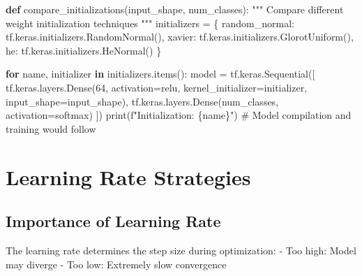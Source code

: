 \documentclass[
  letterpaper,
  DIV=11,
  numbers=noendperiod]{scrreprt}
\newenvironment{Shaded}{\begin{snugshade}}{\end{snugshade}}
\newcommand{\BuiltInTok}[1]{\textcolor[rgb]{0.00,0.23,0.31}{#1}}
\newcommand{\CommentTok}[1]{\textcolor[rgb]{0.37,0.37,0.37}{#1}}
\newcommand{\ControlFlowTok}[1]{\textcolor[rgb]{0.00,0.23,0.31}{\textbf{#1}}}
\newcommand{\DecValTok}[1]{\textcolor[rgb]{0.68,0.00,0.00}{#1}}
\newcommand{\KeywordTok}[1]{\textcolor[rgb]{0.00,0.23,0.31}{\textbf{#1}}}
\newcommand{\NormalTok}[1]{\textcolor[rgb]{0.00,0.23,0.31}{#1}}
\newcommand{\OperatorTok}[1]{\textcolor[rgb]{0.37,0.37,0.37}{#1}}
\newcommand{\SpecialCharTok}[1]{\textcolor[rgb]{0.37,0.37,0.37}{#1}}
\newcommand{\SpecialStringTok}[1]{\textcolor[rgb]{0.13,0.47,0.30}{#1}}
\newcommand{\StringTok}[1]{\textcolor[rgb]{0.13,0.47,0.30}{#1}}
\begin{document}
\begin{Shaded}
\begin{Highlighting}[]
\KeywordTok{def}\NormalTok{ compare\_initializations(input\_shape, num\_classes):}
    \CommentTok{"""}
\CommentTok{    Compare different weight initialization techniques}
\CommentTok{    """}
\NormalTok{    initializers }\OperatorTok{=}\NormalTok{ \{}
        \StringTok{\textquotesingle{}random\_normal\textquotesingle{}}\NormalTok{: tf.keras.initializers.RandomNormal(),}
        \StringTok{\textquotesingle{}xavier\textquotesingle{}}\NormalTok{: tf.keras.initializers.GlorotUniform(),}
        \StringTok{\textquotesingle{}he\textquotesingle{}}\NormalTok{: tf.keras.initializers.HeNormal()}
\NormalTok{    \}}
    
    \ControlFlowTok{for}\NormalTok{ name, initializer }\KeywordTok{in}\NormalTok{ initializers.items():}
\NormalTok{        model }\OperatorTok{=}\NormalTok{ tf.keras.Sequential([}
\NormalTok{            tf.keras.layers.Dense(}\DecValTok{64}\NormalTok{, activation}\OperatorTok{=}\StringTok{\textquotesingle{}relu\textquotesingle{}}\NormalTok{, }
\NormalTok{                                   kernel\_initializer}\OperatorTok{=}\NormalTok{initializer, }
\NormalTok{                                   input\_shape}\OperatorTok{=}\NormalTok{input\_shape),}
\NormalTok{            tf.keras.layers.Dense(num\_classes, activation}\OperatorTok{=}\StringTok{\textquotesingle{}softmax\textquotesingle{}}\NormalTok{)}
\NormalTok{        ])}
        \BuiltInTok{print}\NormalTok{(}\SpecialStringTok{f"Initialization: }\SpecialCharTok{\{}\NormalTok{name}\SpecialCharTok{\}}\SpecialStringTok{"}\NormalTok{)}
        \CommentTok{\# Model compilation and training would follow}
\end{Highlighting}
\end{Shaded}

\section{Learning Rate Strategies}\label{sec-learning-rate}

\subsection{Importance of Learning
Rate}\label{importance-of-learning-rate}

The learning rate determines the step size during optimization: - Too
high: Model may diverge - Too low: Extremely slow convergence
\end{document}
